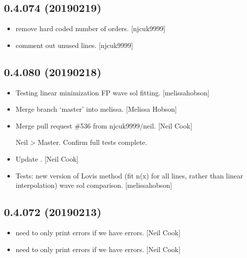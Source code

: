 \documentclass[a4paper,10pt,english]{report}
\begin{document}
\subsection{0.4.074 (2019\sphinxhyphen{}02\sphinxhyphen{}19)}
\label{\detokenize{misc/changelog:id202}}\begin{itemize}
\item {} 
 \sphinxhyphen{} remove hard coded number of orders. {[}njcuk9999{]}

\item {} 
 \sphinxhyphen{} comment out unused lines. {[}njcuk9999{]}

\end{itemize}


\subsection{0.4.080 (2019\sphinxhyphen{}02\sphinxhyphen{}18)}
\label{\detokenize{misc/changelog:id203}}\begin{itemize}
\item {} 
Testing linear minimization FP wave sol fitting. {[}melissa\sphinxhyphen{}hobson{]}

\item {} 
Merge branch ‘master’ into melissa. {[}Melissa Hobson{]}

\item {} 
Merge pull request \#536 from njcuk9999/neil. {[}Neil Cook{]}

Neil \textendash{}\textgreater{} Master. Confirm full tests complete.

\item {} 
Update . {[}Neil Cook{]}

\item {} 
Tests: \sphinxhyphen{}new version of Lovis method (fit n(x) for all lines, rather
than linear interpolation) \sphinxhyphen{} wave sol comparison. {[}melissa\sphinxhyphen{}hobson{]}

\end{itemize}


\subsection{0.4.072 (2019\sphinxhyphen{}02\sphinxhyphen{}13)}
\label{\detokenize{misc/changelog:id204}}\begin{itemize}
\item {} 
 \sphinxhyphen{} need to only print errors if we have errors.
{[}Neil Cook{]}

\item {} 
 \sphinxhyphen{} need to only print errors if we have errors.
{[}Neil Cook{]}

\end{itemize}
\end{document}
